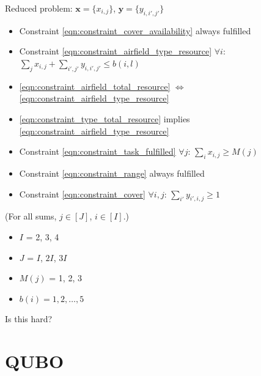\documentclass{article}
\begin{document}
\noindent 
Reduced problem:
$\mathbf x = \{x_{i, j}\}$, $\mathbf y = \{y_{i, i' ,j'}\}$
\begin{itemize}
    \item Constraint \eqref{eqn:constraint_cover_availability} always fulfilled
    \item Constraint \eqref{eqn:constraint_airfield_type_resource} $\forall i$: $\sum_j x_{i,j} + \sum_{i', j'} y_{i, i', j'}  \leq b(i,l)$
    \item \eqref{eqn:constraint_airfield_total_resource} $\Leftrightarrow$ \eqref{eqn:constraint_airfield_type_resource}
    \item \eqref{eqn:constraint_type_total_resource} implies \eqref{eqn:constraint_airfield_type_resource}
    \item Constraint \eqref{eqn:constraint_task_fulfilled} $\forall j$: $\sum_{i} x_{i, j} \geq M(j)$
    \item Constraint \eqref{eqn:constraint_range} always fulfilled
    \item Constraint \eqref{eqn:constraint_cover} $\forall i, j$: $\sum_{i'} y_{i', i, j} \geq 1$
\end{itemize}
(For all sums, $j \in [J]$, $i \in [I]$.)

\begin{itemize}
\item $I$ = 2, 3, 4
\item $J$ = $I$, $2I$, $3I$
\item $M(j)$ = 1, 2, 3
\item $b(i) = 1, 2, \ldots, 5$
\end{itemize}
Is this hard?

\section{QUBO}
\end{document}
